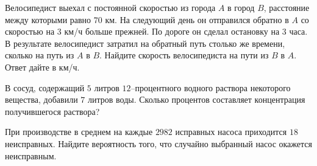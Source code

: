 \begin{listofex}
\begin{minipage}[c]{0.3\textwidth}
	\end{minipage}
	\item Велосипедист выехал с постоянной скоростью из города \( A \) в город \( B \), расстояние между
	которыми равно \( 70 \) км. На следующий день он отправился обратно в \( A \) со скоростью на \( 3 \) км/ч больше прежней. По дороге он сделал остановку на \( 3 \) часа. В результате велосипедист затратил на обратный путь столько же времени, сколько на путь из \( A \) в \( B \). Найдите скорость велосипедиста на пути из \( B \) в \( A \). Ответ дайте в км/ч.
	\item В сосуд, содержащий \( 5 \) литров \( 12 \)--процентного водного раствора некоторого вещества,
	добавили \( 7 \) литров воды. Сколько процентов составляет концентрация получившегося раствора?
	\item При производстве в среднем на каждые \( 2982 \) исправных насоса приходится \( 18 \) неисправных.
	Найдите вероятность того, что случайно выбранный насос окажется неисправным.
\end{listofex}
%	
%	
%	
%	
%	
%	
%	
%	
%	
%	
%	
